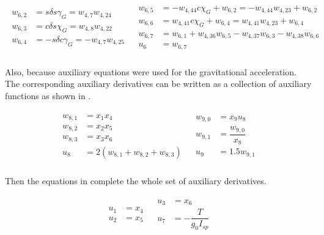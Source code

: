 \begin{align} \label{eq:u6AuxF}
\begin{split}
w_{6,2} &= s\delta s\gamma_{G} = w_{4,7}w_{4,24} \\
w_{6,3} &= c\delta s\chi_{G} = w_{4,8}w_{4,22} \\
w_{6,4} &= -s\delta c\gamma_{G} = -w_{4,7}w_{4,25} \\
\end{split}
&
\begin{split}
w_{6,5} &= -w_{4,44} c\chi_{G} +w_{6,2} = -w_{4,44}w_{4,23}+w_{6,2} \\
w_{6,6} &= w_{4,41} c\chi_{G} + w_{6,4} = w_{4,41}w_{4,23}+w_{6,4} \\
w_{6,7} &= w_{6,1} + w_{4,36}w_{6,5}-w_{4,37}w_{6,3}-w_{4,38}w_{6,6} \\
u_{6} &= w_{6,7} \\
\end{split}
\end{align}

Also, because auxiliary equations were used for the gravitational acceleration. The corresponding auxiliary derivatives can be written as a collection of auxiliary functions as shown in .

\begin{align} \label{eq:u8u9AuxF}
\begin{split}
w_{8,1} &= x_{1}x_{4} \\
w_{8,2} &= x_{2}x_{5} \\
w_{8,3} &= x_{3}x_{6} \\
u_{8} &= 2\left(w_{8,1}+w_{8,2}+w_{8,3}\right) \\ 
\end{split}
&
\begin{split}
w_{9,0} &= x_{9}u_{8} \\
w_{9,1} &= \dfrac{w_{9,0}}{x_{8}} \\
u_{9} &= 1.5 w_{9,1} \\
\end{split}
\end{align}

Then the equations in  complete the whole set of auxiliary derivatives.

\begin{align} \label{eq:restAuxD}
\begin{split}
u_{1} &= x_{4} \\
u_{2} &= x_{5} \\
\end{split}
&
\begin{split}
u_{3} &= x_{6} \\
u_{7} &= -\dfrac{T}{g_{0}I_{sp}} \\
\end{split}
\end{align}

